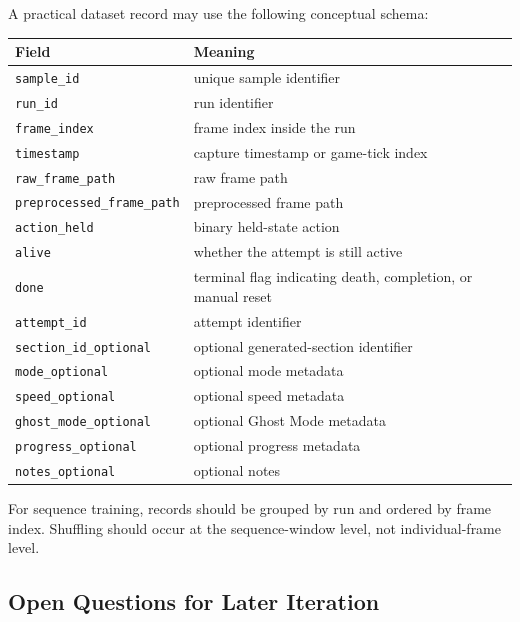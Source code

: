 \documentclass[11pt]{article}
\begin{document}
A practical dataset record may use the following conceptual schema:
\begin{center}
\begin{tabular}{ll}
\toprule
Field & Meaning \\
\midrule
\texttt{sample\_id} & unique sample identifier \\
\texttt{run\_id} & run identifier \\
\texttt{frame\_index} & frame index inside the run \\
\texttt{timestamp} & capture timestamp or game-tick index \\
\texttt{raw\_frame\_path} & raw frame path \\
\texttt{preprocessed\_frame\_path} & preprocessed frame path \\
\texttt{action\_held} & binary held-state action \\
\texttt{alive} & whether the attempt is still active \\
\texttt{done} & terminal flag indicating death, completion, or manual reset \\
\texttt{attempt\_id} & attempt identifier \\
\texttt{section\_id\_optional} & optional generated-section identifier \\
\texttt{mode\_optional} & optional mode metadata \\
\texttt{speed\_optional} & optional speed metadata \\
\texttt{ghost\_mode\_optional} & optional Ghost Mode metadata \\
\texttt{progress\_optional} & optional progress metadata \\
\texttt{notes\_optional} & optional notes \\
\bottomrule
\end{tabular}
\end{center}

For sequence training, records should be grouped by run and ordered by frame index. Shuffling should occur at the sequence-window level, not individual-frame level.

\subsection{Open Questions for Later Iteration}
\end{document}
